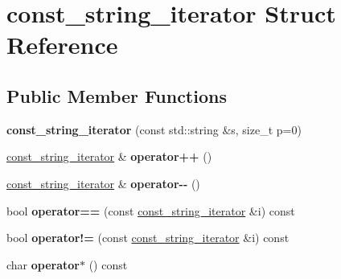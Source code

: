 \hypertarget{structconst__string__iterator}{
\section{const\_\-string\_\-iterator Struct Reference}
\label{structconst__string__iterator}
}
\subsection*{Public Member Functions}
\begin{DoxyCompactItemize}
\item 
\hypertarget{structconst__string__iterator_a20361e1f5e96af1f8ca33155d2a78da3}{
{\bfseries const\_\-string\_\-iterator} (const std::string \&s, size\_\-t p=0)}
\label{structconst__string__iterator_a20361e1f5e96af1f8ca33155d2a78da3}

\item 
\hypertarget{structconst__string__iterator_ab41f415d24cfba36336414a869d785a0}{
\hyperlink{structconst__string__iterator}{const\_\-string\_\-iterator} \& {\bfseries operator++} ()}
\label{structconst__string__iterator_ab41f415d24cfba36336414a869d785a0}

\item 
\hypertarget{structconst__string__iterator_a13a135804605409cfaff58077364b682}{
\hyperlink{structconst__string__iterator}{const\_\-string\_\-iterator} \& {\bfseries operator-\/-\/} ()}
\label{structconst__string__iterator_a13a135804605409cfaff58077364b682}

\item 
\hypertarget{structconst__string__iterator_aa399147fe87d1ea77566f412fb6e926a}{
bool {\bfseries operator==} (const \hyperlink{structconst__string__iterator}{const\_\-string\_\-iterator} \&i) const }
\label{structconst__string__iterator_aa399147fe87d1ea77566f412fb6e926a}

\item 
\hypertarget{structconst__string__iterator_aba88b1b6f892b21dd3ed5418c2051d08}{
bool {\bfseries operator!=} (const \hyperlink{structconst__string__iterator}{const\_\-string\_\-iterator} \&i) const }
\label{structconst__string__iterator_aba88b1b6f892b21dd3ed5418c2051d08}

\item 
\hypertarget{structconst__string__iterator_aa04dec89df536db9d2eef6634d33db54}{
char {\bfseries operator$\ast$} () const }
\label{structconst__string__iterator_aa04dec89df536db9d2eef6634d33db54}

\end{DoxyCompactItemize}
